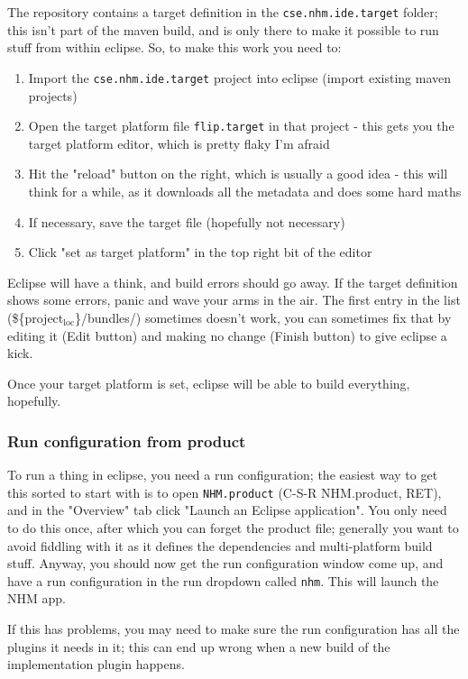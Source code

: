 \documentclass[11pt]{article}
\begin{document}
The repository contains a target definition in the \texttt{cse.nhm.ide.target} folder; this isn't part of the maven build, and is only there to make it possible to run stuff from within eclipse. So, to make this work you need to:

\begin{enumerate}
\item Import the \texttt{cse.nhm.ide.target} project into eclipse (import existing maven projects)
\item Open the target platform file \texttt{flip.target} in that project - this gets you the target platform editor, which is pretty flaky I'm afraid
\item Hit the "reload" button on the right, which is usually a good idea - this will think for a while, as it downloads all the metadata and does some hard maths
\item If necessary, save the target file (hopefully not necessary)
\item Click "set as target platform" in the top right bit of the editor
\end{enumerate}

Eclipse will have a think, and build errors should go away. If the target definition shows some errors, panic and wave your arms in the air. The first entry in the list (\$\{project$_{\text{loc}}$\}/bundles/) sometimes doesn't work, you can sometimes fix that by editing it (Edit button) and making no change (Finish button) to give eclipse a kick.

Once your target platform is set, eclipse will be able to build everything, hopefully.
\subsubsection{Run configuration from product}
\label{sec-2-2-2}
To run a thing in eclipse, you need a run configuration; the easiest way to get this sorted to start with is to open \texttt{NHM.product} (C-S-R NHM.product, RET), and in the "Overview" tab click "Launch an Eclipse application". You only need to do this once, after which you can forget the product file; generally you want to avoid fiddling with it as it defines the dependencies and multi-platform build stuff. Anyway, you should now get the run configuration window come up, and have a run configuration in the run dropdown called \texttt{nhm}. This will launch the NHM app.

If this has problems, you may need to make sure the run configuration has all the plugins it needs in it; this can end up wrong when a new build of the implementation plugin happens.
\end{document}
